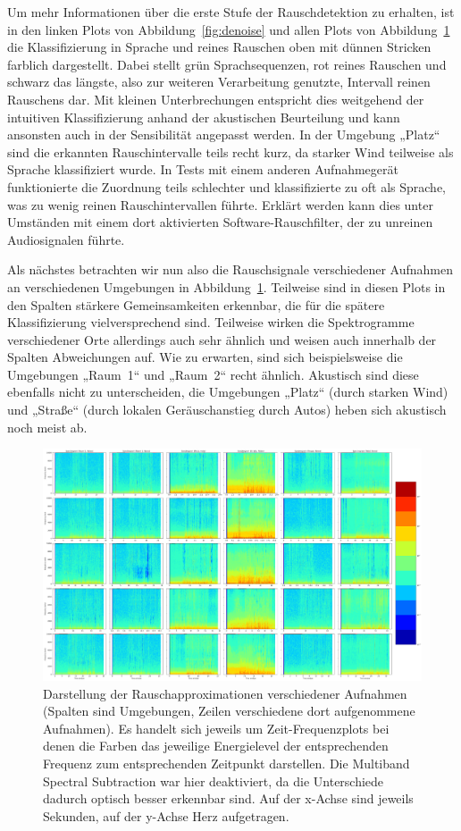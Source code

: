 \documentclass[
	fontsize=10.5pt,
	marginpar=false,
	ngerman,
	accentcolor=3d
	]{tudapub}
\begin{document}
Um mehr Informationen über die erste Stufe der Rauschdetektion zu erhalten, ist in den linken Plots von Abbildung~\ref{fig:denoise} und allen Plots von Abbildung~\ref{fig:compare} die Klassifizierung in Sprache und reines Rauschen oben mit dünnen Stricken farblich dargestellt. Dabei stellt grün Sprachsequenzen, rot reines Rauschen und schwarz das längste, also zur weiteren Verarbeitung genutzte, Intervall reinen Rauschens dar. Mit kleinen Unterbrechungen entspricht dies weitgehend der intuitiven Klassifizierung anhand der akustischen Beurteilung und kann ansonsten auch in der Sensibilität angepasst werden. In der Umgebung „Platz“ sind die erkannten Rauschintervalle teils recht kurz, da starker Wind teilweise als Sprache klassifiziert wurde. In Tests mit einem anderen Aufnahmegerät funktionierte die Zuordnung teils schlechter und klassifizierte zu oft als Sprache, was zu wenig reinen Rauschintervallen führte. Erklärt werden kann dies unter Umständen mit einem dort aktivierten Software-Rauschfilter, der zu unreinen Audiosignalen führte.

Als nächstes betrachten wir nun also die Rauschsignale verschiedener Aufnahmen an verschiedenen Umgebungen in Abbildung~\ref{fig:compare}. Teilweise sind in diesen Plots in den Spalten stärkere Gemeinsamkeiten erkennbar, die für die spätere Klassifizierung vielversprechend sind. Teilweise wirken die Spektrogramme verschiedener Orte allerdings auch sehr ähnlich und weisen auch innerhalb der Spalten Abweichungen auf. Wie zu erwarten, sind sich beispielsweise die Umgebungen „Raum~1“ und „Raum~2“ recht ähnlich. Akustisch sind diese ebenfalls nicht zu unterscheiden, die Umgebungen „Platz“ (durch starken Wind) und „Straße“ (durch lokalen Geräuschanstieg durch Autos) heben sich akustisch noch meist ab.

\begin{figure}[h]
	\centering
	\includegraphics[width=1.0\textwidth]{media/comp}
	\caption{Darstellung der Rauschapproximationen verschiedener Aufnahmen (Spalten sind Umgebungen, Zeilen verschiedene dort aufgenommene Aufnahmen). Es handelt sich jeweils um Zeit-Frequenzplots bei denen die Farben das jeweilige Energielevel der entsprechenden Frequenz zum entsprechenden Zeitpunkt darstellen. Die Multiband Spectral Subtraction war hier deaktiviert, da die Unterschiede dadurch optisch besser erkennbar sind. Auf der x-Achse sind jeweils Sekunden, auf der y-Achse Herz aufgetragen.}
	\label{fig:compare}
\end{figure}
\end{document}
